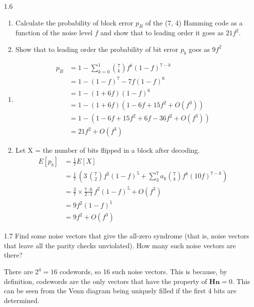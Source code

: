 \documentclass[12pt, a4paper]{article}
\begin{document}
\begin{prob}{1.6}
    \begin{enumerate}
        \item[(a)] Calculate the probability of block error $p_B$ of the
(7, 4) Hamming code as a function of the noise level $f$ and show
that to leading order it goes as $21f^2$.
        \item[(b)] Show that to leading order the probability of bit error $p_b$ goes as $9f^2$
    \end{enumerate}
\end{prob}
\begin{sol}
    \begin{enumerate}
    \item[(a)] \begin{align*}
        p_B &= 1 - \sum_{k=0}^{1} \binom{7}{k} f^k (1-f)^{7-k} \\
        &= 1 - (1-f)^7 - 7f(1-f)^6 \\
        &= 1 - (1+6f)(1-f)^6 \\
        &= 1 - (1+6f)(1-6f+15f^2 + O(f^3)) \\
        &= 1 - (1 - 6f + 15f^2 + 6f - 36f^2 + O(f^3)) \\
        &= 21f^2 + O(f^3)
    \end{align*}
    \item[(b)] Let X = the number of bits flipped in a block after decoding.
    \begin{align*}
        E[p_b] &= \frac{1}{7}E[X] \\
        &= \frac{1}{7} \,  (3 \,\binom{7}{2} f^2(1-f)^5 + \sum_{3}^{7} a_k \binom{7}{k} f^k (10f)^{7-k}) \\
        &= \frac{3}{7} \times \frac{7 \cdot 6}{2 \cdot 1} \,f^2 (1-f)^5 + O(f^3) \\
        &= 9f^2(1-f)^5 \\
        &= 9f^2 + O(f^3)
    \end{align*}
    \end{enumerate}
\end{sol}
\bigskip

\begin{prob}{1.7}
Find some noise vectors that give the all-zero syndrome
(that is, noise vectors that leave all the parity checks unviolated). How
many such noise vectors are there?
\end{prob}
\begin{sol}
There are $2^4 = 16$ codewords, so 16 such noise vectors. This is because, by definition, codewords are the only vectors that have the property of $\mathbf{Hn} = 0$. This can be seen from the Venn diagram being uniquely filled if the first 4 bits are determined.
\end{sol}
\bigskip
\end{document}
